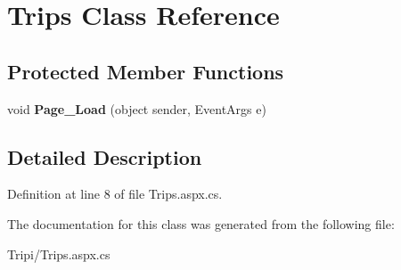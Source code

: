 \hypertarget{class_trips}{
\section{Trips Class Reference}
\label{class_trips}
}
\subsection*{Protected Member Functions}
\begin{DoxyCompactItemize}
\item 
\hypertarget{class_trips_a1cbd5d209954c5fec10dd6382fd329e0}{
void {\bfseries Page\_\-Load} (object sender, EventArgs e)}
\label{class_trips_a1cbd5d209954c5fec10dd6382fd329e0}

\end{DoxyCompactItemize}


\subsection{Detailed Description}


Definition at line 8 of file Trips.aspx.cs.

The documentation for this class was generated from the following file:\begin{DoxyCompactItemize}
\item 
Tripi/Trips.aspx.cs\end{DoxyCompactItemize}
